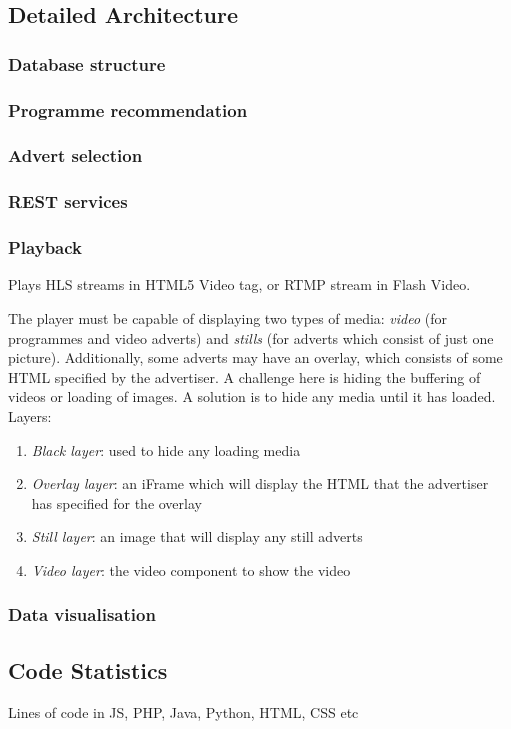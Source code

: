 \subsection{Detailed Architecture}

\subsubsection{Database structure}

\subsubsection{Programme recommendation}

\subsubsection{Advert selection}

\subsubsection{REST services}

\subsubsection{Playback}
Plays HLS streams in HTML5 Video tag, or RTMP stream in Flash Video.

The player must be capable of displaying two types of media: \textit{video} (for programmes and video adverts) and \textit{stills} (for adverts which consist of just one picture). Additionally, some adverts may have an overlay, which consists of some HTML specified by the advertiser. A challenge here is hiding the buffering of videos or loading of images. A solution is to hide any media until it has loaded. Layers:
\begin{enumerate}
\item \textit{Black layer}: used to hide any loading media
\item \textit{Overlay layer}: an iFrame which will display the HTML that the advertiser has specified for the overlay
\item \textit{Still layer}: an image that will display any still adverts
\item \textit{Video layer}: the video component to show the video
\end{enumerate}

\subsubsection{Data visualisation}


\subsection{Code Statistics}
Lines of code in JS, PHP, Java, Python, HTML, CSS etc


